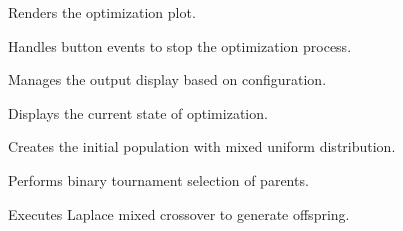 \documentclass[12pt,a4paper]{article}
\begin{document}
\vspace{5mm}
\noindent {}


\noindent Renders the optimization plot.

\vspace{5mm}
\noindent {}


\noindent Handles button events to stop the optimization process.

\vspace{5mm}
\noindent {}


\noindent Manages the output display based on configuration.

\vspace{5mm}
\noindent {}


\noindent Displays the current state of optimization.

\vspace{5mm}
\noindent {}


\noindent Creates the initial population with mixed uniform distribution.

\vspace{5mm}
\noindent {}


\noindent Performs binary tournament selection of parents.

\vspace{5mm}
\noindent {}


\noindent Executes Laplace mixed crossover to generate offspring.
\end{document}
